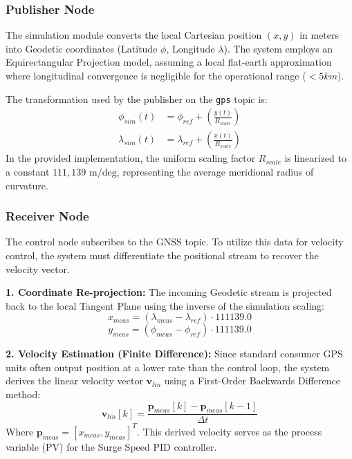 \documentclass[12pt, a4paper, oneside]{report}
\begin{document}
\subsubsection{Publisher Node}
The simulation module converts the local Cartesian position $(x, y)$ in meters into Geodetic coordinates (Latitude $\phi$, Longitude $\lambda$). The system employs an Equirectangular Projection model, assuming a local flat-earth approximation where longitudinal convergence is negligible for the operational range ($< 5km$).

The transformation used by the publisher on the \texttt{gps} topic is:
\begin{align}
    \phi_{sim}(t) &= \phi_{ref} + \left( \frac{y(t)}{R_{scale}} \right) \\
    \lambda_{sim}(t) &= \lambda_{ref} + \left( \frac{x(t)}{R_{scale}} \right)
\end{align}
In the provided implementation, the uniform scaling factor $R_{scale}$ is linearized to a constant $111,139 \text{ m/deg}$, representing the average meridional radius of curvature.



\subsubsection{Receiver Node}
The control node subscribes to the GNSS topic. To utilize this data for velocity control, the system must differentiate the positional stream to recover the velocity vector.

\textbf{1. Coordinate Re-projection:}
The incoming Geodetic stream is projected back to the local Tangent Plane using the inverse of the simulation scaling:
\begin{equation}
    x_{meas} = (\lambda_{meas} - \lambda_{ref}) \cdot 111139.0
\end{equation}
\begin{equation}
    y_{meas} = (\phi_{meas} - \phi_{ref}) \cdot 111139.0
\end{equation}

\textbf{2. Velocity Estimation (Finite Difference):}
Since standard consumer GPS units often output position at a lower rate than the control loop, the system derives the linear velocity vector $\mathbf{v}_{lin}$ using a First-Order Backwards Difference method:
\begin{equation}
    \mathbf{v}_{lin}[k] = \frac{\mathbf{p}_{meas}[k] - \mathbf{p}_{meas}[k-1]}{\Delta t}
\end{equation}
Where $\mathbf{p}_{meas} = [x_{meas}, y_{meas}]^T$. This derived velocity serves as the process variable (PV) for the Surge Speed PID controller.
\end{document}
